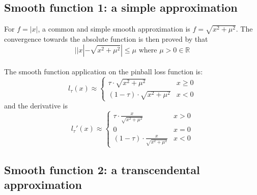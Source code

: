 \subsection{Smooth function 1: a simple approximation}
\label{subsec: smooth_sqrt}

For $f = |x|$, a common and simple smooth approximation is $
    f = \sqrt{x^2 + \mu^2}
$.
 The convergence towards the absolute function is then proved by \citeauthor{voroninConvolutionBasedSmooth2015a}\cite{voroninConvolutionBasedSmooth2015a} that 
\begin{equation}
    ||x| - \sqrt{x^2 + \mu^2}| \leq \mu \text{  where } \mu > 0 \in \mathbb{R}
\end{equation}
\\
The smooth function application on the pinball loss function is:
\begin{equation}
    l_\tau(x) \approx 
    \begin{cases}
        \tau \cdot \sqrt{x^2 + \mu^2} & {x \geq 0} \\
        (1-\tau) \cdot \sqrt{x^2 + \mu^2} & {x < 0}
    \end{cases}
\end{equation}
and the derivative is
\begin{equation}
    l_\tau\prime(x) \approx 
    \begin{cases}
        \tau \cdot \frac{x}{\sqrt{x^2 + \mu^2}} & {x > 0} \\
        0 & {x=0} \\
        (1-\tau) \cdot \frac{x}{\sqrt{x^2 + \mu^2}} & {x<0}
    \end{cases}
\end{equation}
\subsection{Smooth function 2: a transcendental approximation}
\label{subsec: smooth_new}

